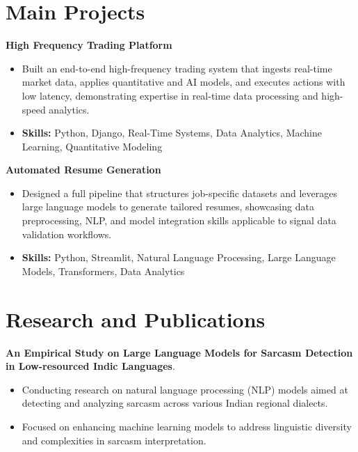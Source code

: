 \documentclass[a4paper,11pt]{article}
\begin{document}
\section{\textbf{Main Projects}}

\vspace{1mm}
  \textbf{High Frequency Trading Platform  }
\vspace{-1.5mm} %
\begin{itemize}
  \item Built an end-to-end high-frequency trading system that ingests real-time market data, applies quantitative and AI models, and executes actions with low latency, demonstrating expertise in real-time data processing and high-speed analytics.
\vspace{-3mm}
  \item \textbf{Skills:} Python, Django, Real-Time Systems, Data Analytics, Machine Learning, Quantitative Modeling
\end{itemize}


\vspace{1mm}
   \textbf{Automated Resume Generation }
\vspace{-1.5mm} %
\begin{itemize}
  \item Designed a full pipeline that structures job-specific datasets and leverages large language models to generate tailored resumes, showcasing data preprocessing, NLP, and model integration skills applicable to signal data validation workflows.
\vspace{-3mm}
  \item \textbf{Skills:} Python, Streamlit, Natural Language Processing, Large Language Models, Transformers, Data Analytics
\end{itemize}



\section{\textbf{Research and Publications} \hfill }
\vspace{1mm}
  \textbf{An Empirical Study on Large Language Models for Sarcasm Detection in Low-resourced Indic Languages}.
\vspace{-1mm} %
\begin{itemize}
  \item Conducting research on natural language processing (NLP) models aimed at detecting and analyzing sarcasm across various Indian regional dialects.
\vspace{-3mm}
  \item Focused on enhancing machine learning models to address linguistic diversity and complexities in sarcasm interpretation.
\end{itemize}
\end{document}
